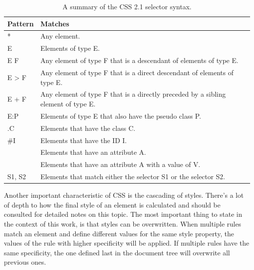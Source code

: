 \begin{table}[tp]
    \centering
    \begin{tabularx}{\linewidth}{| l | X |}
        \hline
        \textbf{Pattern} & \textbf{Matches}                                                                  \\ \hline
        *                & Any element.                                                                      \\ \hline
        E                & Elements of type E.                                                               \\ \hline
        E F              & Any element of type F that is a descendant of elements of type E.                 \\ \hline
        E > F            & Any element of type F that is a direct descendant of elements of type E.          \\ \hline
        E + F            & Any element of type F that is a directly preceded by a sibling element of type E. \\ \hline
        E:P              & Elements of type E that also have the pseudo class P.                             \\ \hline
        .C               & Elements that have the class  C.                                                  \\ \hline
        \#I              & Elements that have the ID I.                                                      \\ \hline
        [A]              & Elements that have an attribute A.                                                \\ \hline
        [A=V]            & Elements that have an attribute A with a value of V.                              \\ \hline
        S1, S2           & Elements that match either the selector S1 or the selector S2.                    \\ \hline
    \end{tabularx}
    \caption[CSS 2.1 Selector Syntax]
    {
        A summary of the CSS 2.1 selector syntax.
    }
    \label{tab:CSSSelectorSyntax}
\end{table}

Another important characteristic of CSS is the cascading of styles. There's a lot of depth to how the final style of an element is calculated and \cite{CSS21} should be consulted for detailed notes on this topic. The most important thing to state in the context of this work, is that styles can be overwritten. When multiple rules match an element and define different values for the same style property, the values of the rule with higher specificity will be applied. If multiple rules have the same specificity, the one defined last in the document tree will overwrite all previous ones.

